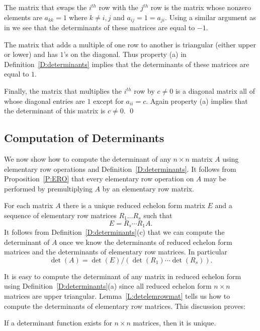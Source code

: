 \proof The matrix that swaps the $i^{th}$ row with the $j^{th}$
row is the matrix whose nonzero elements are $a_{kk}=1$ where
$k\neq i,j$ and $a_{ij}=1=a_{ji}$.  Using a similar argument as
in  we see that the determinants of these
matrices are equal to $-1$.
 
The matrix that adds a multiple of one row to another is
triangular (either upper or lower) and has $1$'s on the
diagonal.  Thus property (a) in Definition~\ref{D:determinants}
implies that the determinants of
these matrices are equal to $1$.
 
Finally, the matrix that multiplies the $i^{th}$ row by $c\neq
0$ is a diagonal matrix all of whose diagonal entries are $1$
except for $a_{ii}=c$.  Again property (a) implies that the
determinant of this matrix is $c\neq 0$. \qed


\subsection*{Computation of Determinants}

We now show how to compute the determinant of any $n\times n$ matrix $A$ 
using elementary row operations and Definition~\ref{D:determinants}.  It 
follows from Proposition~\ref{P:ERO} that every elementary row operation 
on $A$ may be performed by premultiplying $A$ by an elementary row matrix. 

For each matrix $A$ there is a unique 
reduced echelon form matrix
$E$ and a sequence of elementary row matrices $R_1\ldots R_s$
such that 
\begin{equation}  \label{e:rowreduction}
E = R_s\cdots R_1A.
\end{equation}
It follows from Definition~\ref{D:determinants}(c) that we can
compute the determinant of $A$ once we know the determinants of
reduced echelon form matrices and the determinants of elementary
row matrices.  In particular
\begin{equation}  \label{e:detformula}
\det(A) = \det(E)/(\det(R_1)\cdots\det(R_s)).
\end{equation}

It is easy to compute the determinant of any matrix in reduced echelon 
form using Definition~\ref{D:determinants}(a) since all reduced echelon 
form $n\times n$ matrices are upper triangular.  Lemma~\ref{L:detelemrowmat}  
tells us how to compute the determinants of elementary row matrices.  This 
discussion proves: 
\begin{prop}
If a determinant function exists for $n\times n$ matrices, then it is unique. 
\end{prop}


